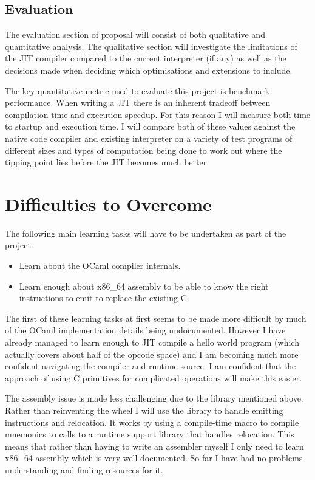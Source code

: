 \documentclass[12pt,a4paper, headings=standardclasses]{scrartcl}
\begin{document}
\subsection*{Evaluation}

The evaluation section of proposal will consist of both qualitative and
quantitative analysis. The qualitative section will investigate the limitations
of the JIT compiler compared to the current interpreter (if any) as well as the
decisions made when deciding which optimisations and extensions to include.

The key quantitative metric used to evaluate this project is benchmark performance.
When writing a JIT there is an inherent tradeoff between compilation time and execution
speedup. For this reason I will measure both time to startup and execution
time. I will compare both of these values against the native code compiler
and existing interpreter on a variety of test programs of different sizes and
types of computation being done to work out where the tipping point lies before
the JIT becomes much better.

\section*{Difficulties to Overcome}

The following main learning tasks will have to be undertaken as part of the
project.

\begin{itemize}
      \item Learn about the OCaml compiler internals.
      \item Learn enough about x86\_64 assembly to be able to know the right
            instructions to emit to replace the existing C.
\end{itemize}

The first of these learning tasks at first seems to be made more difficult by
much of the OCaml implementation details being undocumented. However I have
already managed to learn enough to JIT compile a hello world program (which
actually covers about half of the opcode space) and I am becoming much more
confident navigating the compiler and runtime source. I am confident that the
approach of using C primitives for complicated operations will make this easier.

The assembly issue is made less challenging due to the library mentioned above.
Rather than reinventing the wheel I will use the library to handle emitting
instructions and relocation. It works by using a compile-time macro to
compile mnemonics to calls to a runtime support library that handles
relocation. This means that rather than having to write an assembler myself
I only need to learn x86\_64 assembly which is very well documented. So far I have
had no problems understanding and finding resources for it.
\end{document}
